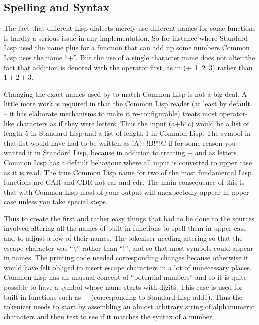 \subsection{Spelling and Syntax}
The fact that different Lisp dialects merely use different names for
some functions is hardly a serious issue in any implementation. So for
instance where Standard Lisp used the name {\tx plus} for a function that
can add up some numbers Common Lisp uses the name ``{\tx +}''. But the
use of a single character name does not alter the fact that addition is
denoted with the operator first, as in {\tx (+~1~2~3)} rather than $1+2+3$.

Changing the exact names used by \vsl{} to match Common Lisp is not a big deal.
A little more work is required in that the Common Lisp reader (at least by
default -- it has elaborate mechanisms to make it re-configurable) treats most
operator-like characters as if they were letters. Thus the input
{\tx (a+b*c)} would be a list of length 5 in Standard Lisp and a list of
length 1 in Common Lisp. The symbol in that list would have had to be written
as {\tx !A!+!B!*!C} if for some reason you wanted it in
Standard Lisp, because in addition to treating {\tx +} and {\tx *} as letters
Common Lisp has a default behaviour where all input is converted to upper
case as it is read. The true Common Lisp name for two of the most fundamental
Lisp functions are {\tx CAR} and {\tx CDR} not {\tx car} and {\tx cdr}. The
main consequence of this is that with Common Lisp most of your output will
unexpectedly appear in upper case unless you take special steps.

Thus to create \vcl{} the first and rather easy things that had to be done
to the \vsl{} sources involved altering all the names of built-in functions to
spell them in upper case and to adjust a few of their names. The tokeniser
needing altering so that the escape character was ``{\tx \textbackslash}''
rather than ``{\tx !}'', and so that most symbols could appear in names. The
printing code needed corresponding changes because otherwise it would have
felt obliged to insert escape characters in a lot of unnecessary places.
Common Lisp has an unusual concept of ``potential numbers'' and so it is
quite possible to have a symbol whose name starts with digits. This case is
used for built-in functions such as {+} (corresponding to Standard Lisp
{\tx add1}). Thus the tokenizer needs to start by assembling an almost
arbitrary string of alphanumeric characters and then test to see if it matches
the syntax of a number.

